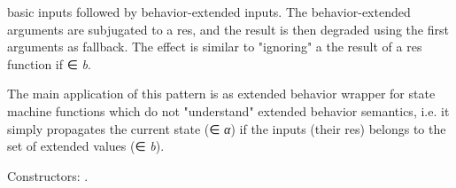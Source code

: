 \begin{haddockdesc}
 basic inputs followed by  behavior-extended inputs. The 
 behavior-extended arguments are subjugated to a res, and the
 result is then degraded using the first  arguments as
 fallback. The effect is similar to "ignoring" a the result of a
 res function if ∈ \emph{b}.\par
The main application of this pattern is as extended behavior
 wrapper for state machine functions which do not "understand"
 extended behavior semantics, i.e. it simply propagates the current
 state (∈ \emph{α}) if the inputs (their res) belongs
 to the set of extended values (∈ \emph{b}).\par
Constructors: .\par

\end{haddockdesc}